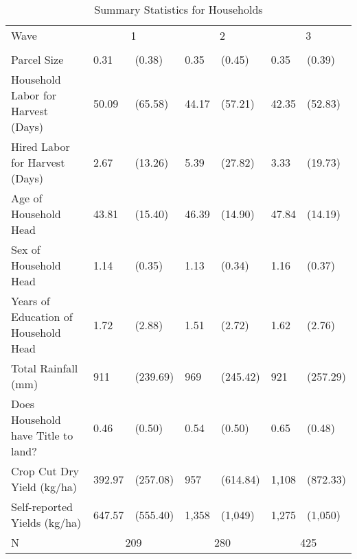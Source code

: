 \begin{table}
\caption{Summary Statistics for Households}
\label{tbl:summary}
\begin{tabular}{lllllll}
\toprule
Wave & \multicolumn{2}{c}{1} & \multicolumn{2}{c}{2} & \multicolumn{2}{c}{3} \\
 &  &  &  &  &  &  \\
\midrule
Parcel Size & 0.31 & (0.38) & 0.35 & (0.45) & 0.35 & (0.39) \\
Household Labor for Harvest (Days) & 50.09 & (65.58) & 44.17 & (57.21) & 42.35 & (52.83) \\
Hired Labor for Harvest (Days) & 2.67 & (13.26) & 5.39 & (27.82) & 3.33 & (19.73) \\
Age of Household Head & 43.81 & (15.40) & 46.39 & (14.90) & 47.84 & (14.19) \\
Sex of Household Head & 1.14 & (0.35) & 1.13 & (0.34) & 1.16 & (0.37) \\
Years of Education of Household Head & 1.72 & (2.88) & 1.51 & (2.72) & 1.62 & (2.76) \\
Total Rainfall (mm) & 911 & (239.69) & 969 & (245.42) & 921 & (257.29) \\
Does Household have Title to land? & 0.46 & (0.50) & 0.54 & (0.50) & 0.65 & (0.48) \\
Crop Cut Dry Yield (kg/ha) & 392.97 & (257.08) & 957 & (614.84) & 1,108 & (872.33) \\
Self-reported Yields (kg/ha) & 647.57 & (555.40) & 1,358 & (1,049) & 1,275 & (1,050) \\
\midrule
N & \multicolumn{2}{c}{209}&\multicolumn{2}{c}{280}&\multicolumn{2}{c}{425}\\
\bottomrule
\end{tabular}
\end{table}
